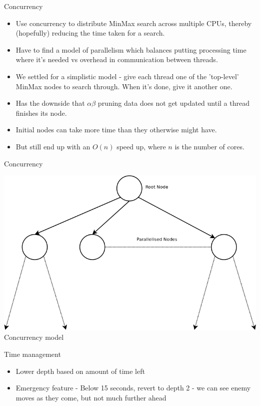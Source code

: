 \documentclass{beamer}
\begin{document}
\begin{frame}{Concurrency}
    \begin{itemize}
  \item
	Use concurrency to distribute MinMax search across multiple CPUs, thereby (hopefully) reducing the time taken for a search.
 \item
	Have to find a model of parallelism which balances putting processing time where it's needed vs overhead in communication between threads.
 \item
	We settled for a simplistic model - give each thread one of the 'top-level' MinMax nodes to search through. When it's done, give it another one.
 \item
	Has the downside that $\alpha \beta$ pruning data does not get updated until a thread finishes its node.
 \item
	Initial nodes can take more time than they otherwise might have.
 \item
	But still end up with an $O(n)$ speed up, where $n$ is the number of cores.
  \end{itemize}
\end{frame}

\begin{frame}{Concurrency}
\begin{center}
\includegraphics[scale=0.35]{concurrency.png}
\\Concurrency model
\end{center}
\end{frame}

\begin{frame}{Time management}
    \begin{itemize}
  \item
    Lower depth based on amount of time left
  \item
    Emergency feature - Below 15 seconds, revert to depth 2 - we can see enemy moves as they come, but not much further ahead
  \end{itemize}
\end{frame}
\end{document}
